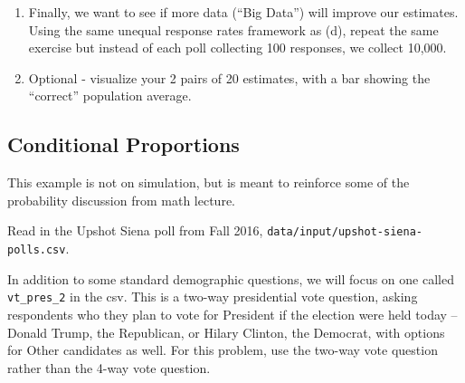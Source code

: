 \documentclass[]{book}
\newenvironment{Shaded}{\begin{snugshade}}{\end{snugshade}}
\theoremstyle{definition}
\theoremstyle{definition}
\theoremstyle{definition}
\theoremstyle{remark}
\begin{document}
\begin{Shaded}
\begin{Highlighting}[]
\begin{Shaded}
\begin{Highlighting}[]
\begin{Shaded}
\begin{Highlighting}[]
\begin{enumerate}
\def\labelenumi{(\alph{enumi})}
\setcounter{enumi}{4}
\item
  Finally, we want to see if more data (``Big Data'') will improve our estimates. Using the same unequal response rates framework as (d), repeat the same exercise but instead of each poll collecting 100 responses, we collect 10,000.
\item
  Optional - visualize your 2 pairs of 20 estimates, with a bar showing the ``correct'' population average.
\end{enumerate}

\hypertarget{conditional-proportions}{%
\subsection*{Conditional Proportions}\label{conditional-proportions}}

This example is not on simulation, but is meant to reinforce some of the probability discussion from math lecture.

Read in the Upshot Siena poll from Fall 2016, \texttt{data/input/upshot-siena-polls.csv}.

In addition to some standard demographic questions, we will focus on one called \texttt{vt\_pres\_2} in the csv. This is a two-way presidential vote question, asking respondents who they plan to vote for President if the election were held today -- Donald Trump, the Republican, or Hilary Clinton, the Democrat, with options for Other candidates as well. For this problem, use the two-way vote question rather than the 4-way vote question.


\end{Highlighting}
\end{Shaded}
\end{Highlighting}
\end{Shaded}
\end{Highlighting}
\end{Shaded}
\end{document}

